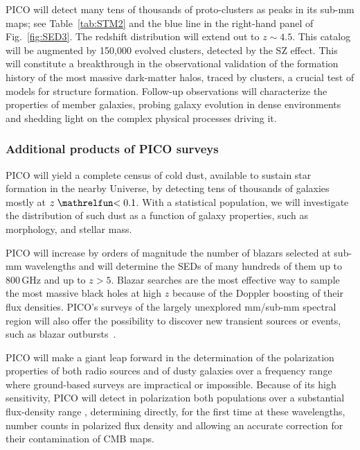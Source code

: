 \documentclass[PICOReport.tex]{subfiles}
\begin{document}
PICO will detect many tens of thousands of proto-clusters as peaks in its sub-mm maps; see Table~\ref{tab:STM2} and the blue line in the right-hand panel of Fig.~\ref{fig:SED3}. The redshift distribution will extend out to $z\sim4.5$. This catalog will be augmented by 150,000 evolved clusters, detected by the SZ effect. This will constitute a breakthrough in the observational validation of the formation history of the most massive dark-matter halos, traced by clusters, a crucial test of models for structure formation. Follow-up observations will characterize the properties of member galaxies, probing galaxy evolution in dense environments and shedding light on the complex physical processes driving it.

\subsubsection{Additional products of PICO surveys}

PICO will yield a complete census of cold dust, available to sustain star formation in the nearby Universe, by detecting tens of thousands of galaxies mostly at $z\simlt 0.1$. With a statistical population, we will investigate the distribution of such dust as a function of galaxy properties, such as morphology, and stellar mass. 

PICO will increase by orders of magnitude the number of blazars selected at sub-mm wavelengths and will determine the SEDs of many hundreds of them up to 800\,GHz and up to $z> 5$. Blazar searches are the most effective way to sample the most massive black holes at high $z$ because of the Doppler boosting of their flux densities. PICO's surveys of the largely unexplored mm/sub-mm spectral region will also offer the possibility to discover new transient sources or events, such as blazar outbursts~\cite{Metzger2015}.

PICO will make a giant leap forward in the determination of the polarization properties of both radio sources and of dusty galaxies over a frequency range where ground-based surveys are impractical or impossible. Because of its high sensitivity, PICO will detect in polarization both populations over a substantial flux-density range , determining directly, for the first time at these wavelengths, number counts in polarized flux density and allowing an accurate correction for their contamination of CMB maps. 
\end{document}
